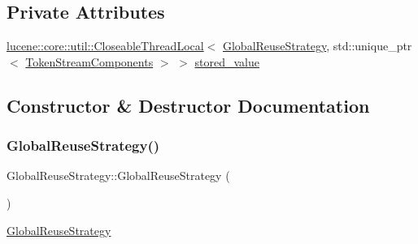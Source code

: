 \subsection*{Private Attributes}
\begin{DoxyCompactItemize}
\item 
\mbox{\hyperlink{classlucene_1_1core_1_1util_1_1CloseableThreadLocal}{lucene\+::core\+::util\+::\+Closeable\+Thread\+Local}}$<$ \mbox{\hyperlink{classlucene_1_1core_1_1analysis_1_1GlobalReuseStrategy}{Global\+Reuse\+Strategy}}, std\+::unique\+\_\+ptr$<$ \mbox{\hyperlink{classlucene_1_1core_1_1analysis_1_1TokenStreamComponents}{Token\+Stream\+Components}} $>$ $>$ \mbox{\hyperlink{classlucene_1_1core_1_1analysis_1_1GlobalReuseStrategy_aa46c26280248f8f15c138db30d2a5991}{stored\+\_\+value}}
\end{DoxyCompactItemize}


\subsection{Constructor \& Destructor Documentation}
\mbox{\label{classlucene_1_1core_1_1analysis_1_1GlobalReuseStrategy_ac91815e66d775fd48aad17fb5a78d266}} 
\subsubsection{\texorpdfstring{Global\+Reuse\+Strategy()}{GlobalReuseStrategy()}}
{\footnotesize\ttfamily Global\+Reuse\+Strategy\+::\+Global\+Reuse\+Strategy (\begin{DoxyParamCaption}{ }\end{DoxyParamCaption})}

\mbox{\hyperlink{classlucene_1_1core_1_1analysis_1_1GlobalReuseStrategy}{Global\+Reuse\+Strategy}} \mbox{\label{classlucene_1_1core_1_1analysis_1_1GlobalReuseStrategy_a536f4c3459f19db2a356e6cedb575c1a}} 
